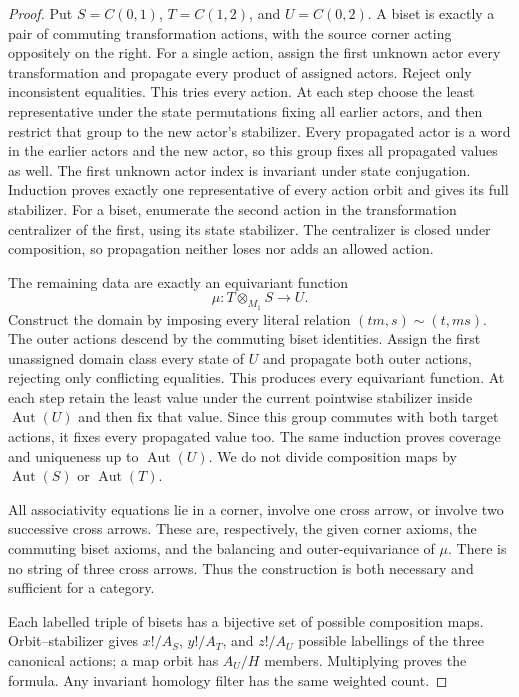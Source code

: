 \begin{proof}
Put $S=C(0,1)$, $T=C(1,2)$, and $U=C(0,2)$.
A biset is exactly a pair of commuting transformation actions,
with the source corner acting oppositely on the right.
For a single action, assign the first unknown actor every
transformation and propagate every product of assigned actors.
Reject only inconsistent equalities. This tries every action.
At each step choose the least representative under the state
permutations fixing all earlier actors, and then restrict that
group to the new actor's stabilizer. Every propagated actor is
a word in the earlier actors and the new actor, so this group
fixes all propagated values as well. The first unknown actor
index is invariant under state conjugation. Induction proves
exactly one representative of every action orbit and gives its
full stabilizer. For a biset, enumerate the second action in
the transformation centralizer of the first, using its state
stabilizer. The centralizer is closed under composition, so
propagation neither loses nor adds an allowed action.

The remaining data are exactly an equivariant function
\[
 \mu:T\otimes_{M_1}S\longrightarrow U.
\]
Construct the domain by imposing every literal relation
$(tm,s)\sim(t,ms)$. The outer actions descend by the commuting
biset identities. Assign the first unassigned domain class
every state of $U$ and propagate both outer actions, rejecting
only conflicting equalities. This produces every equivariant
function. At each step retain the least value under the current
pointwise stabilizer inside $\operatorname{Aut}(U)$ and then
fix that value. Since this group commutes with both target
actions, it fixes every propagated value too. The same induction
proves coverage and uniqueness up to $\operatorname{Aut}(U)$.
We do not divide composition maps by $\operatorname{Aut}(S)$
or $\operatorname{Aut}(T)$.

All associativity equations lie in a corner, involve one cross
arrow, or involve two successive cross arrows. These are,
respectively, the given corner axioms, the commuting biset
axioms, and the balancing and outer-equivariance of $\mu$.
There is no string of three cross arrows. Thus the construction
is both necessary and sufficient for a category.

Each labelled triple of bisets has a bijective set of possible
composition maps. Orbit--stabilizer gives $x!/A_S$, $y!/A_T$,
and $z!/A_U$ possible labellings of the three canonical actions;
a map orbit has $A_U/H$ members. Multiplying proves the formula.
Any invariant homology filter has the same weighted count.
\end{proof}

